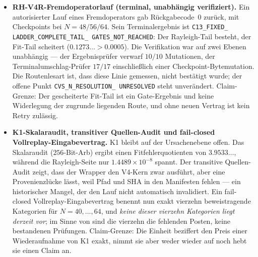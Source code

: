 \documentclass[12pt,a4paper]{article}
\theoremstyle{definition}
\theoremstyle{remark}
\begin{document}
\begin{itemize}
  \item \textbf{RH-V4R-Fremdoperatorlauf (terminal, unabhängig
    verifiziert).} Ein autorisierter Lauf eines Fremdoperators gab
    Rückgabecode~$0$ zurück, mit Checkpoints bei $N = 48/56/64$. Sein
    Terminalergebnis ist \texttt{C13\_\allowbreak FIXED\_\allowbreak
    LADDER\_\allowbreak COMPLETE\_\allowbreak TAIL\_\allowbreak
    GATES\_\allowbreak NOT\_\allowbreak REACHED}: Der Rayleigh-Tail
    besteht, der Fit-Tail scheitert ($0.1273\ldots > 0.0005$). Die
    Verifikation war auf zwei Ebenen unabhängig --- der Ergebnisprüfer
    verwarf $10/10$ Mutationen, der Terminalumschlag-Prüfer $17/17$
    einschließlich einer Checkpoint-Bytemutation. Die Routenlesart ist,
    dass diese Linie gemessen, nicht bestätigt wurde; der offene Punkt
    \texttt{CVS\_\allowbreak N\_\allowbreak RESOLUTION\_\allowbreak
    UNRESOLVED} steht unverändert. Claim-Grenze: Der gescheiterte Fit-Tail
    ist ein Gate-Ergebnis und keine Widerlegung der zugrunde liegenden
    Route, und ohne neuen Vertrag ist kein Retry zulässig.

  \item \textbf{K1-Skalaraudit, transitiver Quellen-Audit und
    fail-closed Vollreplay-Eingabevertrag.} K1 bleibt auf der
    Ursachenebene offen. Das Skalaraudit ($256$-Bit-Arb) ergibt einen
    Fitfehlerquotienten von $3.9533\ldots$, während die Rayleigh-Seite nur
    $1.4489\times 10^{-8}$ spannt. Der transitive Quellen-Audit zeigt, dass
    der Wrapper den V4-Kern zwar ausführt, aber eine Provenienzlücke lässt,
    weil Pfad und SHA in den Manifesten fehlen --- ein historischer Mangel,
    der den Lauf nicht automatisch invalidiert. Ein fail-closed
    Vollreplay-Eingabevertrag benennt nun exakt vierzehn beweistragende
    Kategorien für $N = 40,\dots,64$, und \emph{keine dieser vierzehn
    Kategorien liegt derzeit vor}; im Sinne von  sind
    die vierzehn die fehlenden Posten, keine bestandenen Prüfungen.
    Claim-Grenze: Die Einheit beziffert den Preis einer Wiederaufnahme von
    K1 exakt, nimmt sie aber weder wieder auf noch hebt sie einen Claim an.


\end{itemize}
\end{document}
